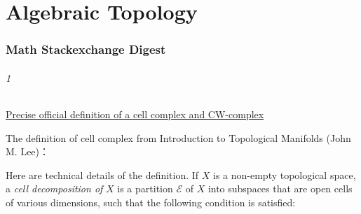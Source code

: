 \part{Algebraic Topology}

\section{Math Stackexchange Digest}
\paragraph{1}\href{https://math.stackexchange.com/questions/42005}{Precise official definition of a cell complex and CW-complex}

The definition of cell complex from Introduction to Topological Manifolds (John M. Lee)：

   Here are technical details of the definition. If $X$ is a non-empty topological space, a {\it cell decomposition of} $X$ is a partition $\mathcal{E}$ of $X$ into subspaces that are open cells of various dimensions, such that the following condition is satisfied:
   
